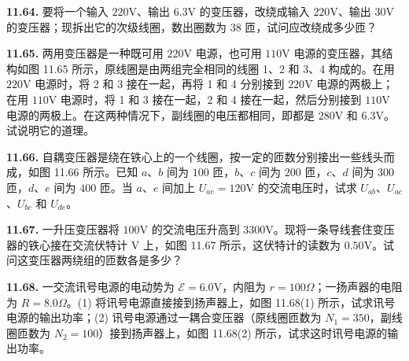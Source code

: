 \vfill
\newpage

\textbf{11.64.} 要将一个输入 $220\mathrm{V}$、输出 $6.3\mathrm{V}$ 的变压器，改绕成输入 $220\mathrm{V}$、输出 $30\mathrm{V}$ 的变压器；现拆出它的次级线圈，数出圈数为 $38$ 匝，试问应改绕成多少匝？

\vfill
\newpage

\textbf{11.65.} 两用变压器是一种既可用 $220\mathrm{V}$ 电源，也可用 $110\mathrm{V}$ 电源的变压器，其结构如图 11.65 所示，原线圈是由两组完全相同的线圈 1、2 和 3、4 构成的。在用 $220\mathrm{V}$ 电源时，将 2 和 3 接在一起，再将 1 和 4 分别接到 $220\mathrm{V}$ 电源的两极上；在用 $110\mathrm{V}$ 电源时，将 1 和 3 接在一起，2 和 4 接在一起，然后分别接到 $110\mathrm{V}$ 电源的两极上。在这两种情况下，副线圈的电压都相同，即都是 $280\mathrm{V}$ 和 $6.3\mathrm{V}$。试说明它的道理。

\begin{center}
\end{center}

\vfill
\newpage

\textbf{11.66.} 自耦变压器是绕在铁心上的一个线圈，按一定的匝数分别接出一些线头而成，如图 11.66 所示。已知 $a$、$b$ 间为 $100$ 匝，$b$、$c$ 间为 $200$ 匝，$c$、$d$ 间为 $300$ 匝，$d$、$e$ 间为 $400$ 匝。当 $a$、$e$ 间加上 $U_{ae} = 120\mathrm{V}$ 的交流电压时，试求 $U_{ab}$、$U_{ac}$、$U_{bc}$ 和 $U_{de}$。

\begin{center}
\end{center}

\vfill
\newpage

\textbf{11.67.} 一升压变压器将 $100\mathrm{V}$ 的交流电压升高到 $3300\mathrm{V}$。现将一条导线套住变压器的铁心接在交流伏特计 $\mathrm{V}$ 上，如图 11.67 所示，这伏特计的读数为 $0.50\mathrm{V}$。试问这变压器两绕组的匝数各是多少？

\begin{center}
\end{center}

\vfill
\newpage

\textbf{11.68.} 一交流讯号电源的电动势为 $\mathcal{E} = 6.0\mathrm{V}$，内阻为 $r = 100\Omega$；一扬声器的电阻为 $R = 8.0\Omega$。(1) 将讯号电源直接接到扬声器上，如图 11.68(1) 所示，试求讯号电源的输出功率；(2) 讯号电源通过一耦合变压器（原线圈匝数为 $N_{1} = 350$，副线圈匝数为 $N_{2} = 100$）接到扬声器上，如图 11.68(2) 所示，试求这时讯号电源的输出功率。

